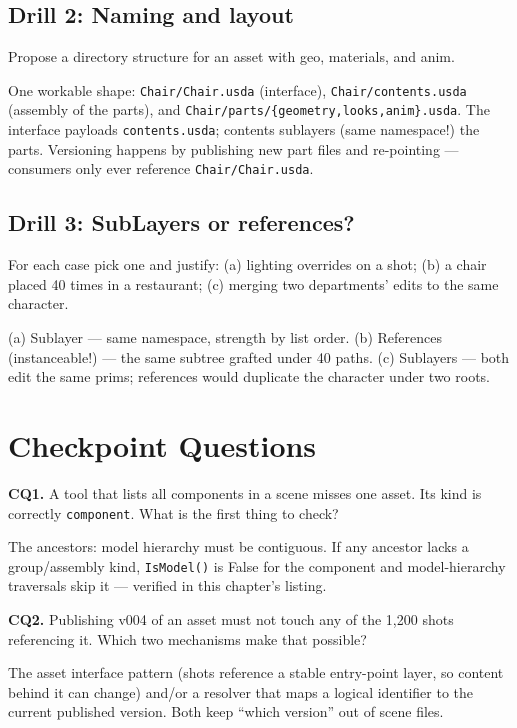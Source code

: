 \subsection*{Drill 2: Naming and layout}
Propose a directory structure for an asset with geo, materials, and anim.
\begin{DrillSolution}
One workable shape: \texttt{Chair/Chair.usda} (interface),
\texttt{Chair/contents.usda} (assembly of the parts), and
\texttt{Chair/parts/\{geometry,looks,anim\}.usda}. The interface payloads
\texttt{contents.usda}; contents sublayers (same namespace!) the parts.
Versioning happens by publishing new part files and re-pointing ---
consumers only ever reference \texttt{Chair/Chair.usda}.
\end{DrillSolution}

\subsection*{Drill 3: SubLayers or references?}
For each case pick one and justify: (a) lighting overrides on a shot; (b) a
chair placed 40 times in a restaurant; (c) merging two departments' edits to
the same character.
\begin{DrillSolution}
(a) Sublayer --- same namespace, strength by list order. (b) References
(instanceable!) --- the same subtree grafted under 40 paths. (c) Sublayers
--- both edit the same prims; references would duplicate the character under
two roots.
\end{DrillSolution}

\section*{Checkpoint Questions}

\noindent\textbf{CQ1.} A tool that lists all components in a scene misses one
asset. Its kind is correctly \texttt{component}. What is the first thing to
check?
\begin{DrillSolution}
The ancestors: model hierarchy must be contiguous. If any ancestor lacks a
group/assembly kind, \texttt{IsModel()} is False for the component and
model-hierarchy traversals skip it --- verified in this chapter's listing.
\end{DrillSolution}

\noindent\textbf{CQ2.} Publishing v004 of an asset must not touch any of the
1{,}200 shots referencing it. Which two mechanisms make that possible?
\begin{DrillSolution}
The asset interface pattern (shots reference a stable entry-point layer, so
content behind it can change) and/or a resolver that maps a logical
identifier to the current published version. Both keep ``which version''
out of scene files.
\end{DrillSolution}

